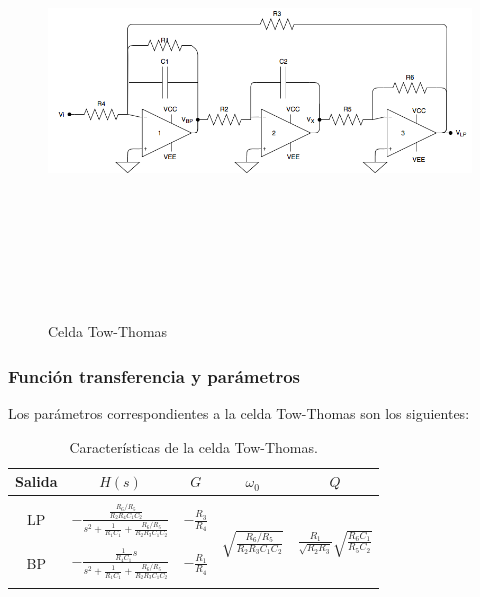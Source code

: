\begin{figure}[H] %
	\centering
	\includegraphics[width=12cm,height=12cm,keepaspectratio]{../EJ4/imagenes/TOW-THOMAS.png}
	\caption{Celda Tow-Thomas}
	\label{tow_thomas}
\end{figure}

\subsubsection{Funci\'on transferencia y par\'ametros}
Los par\'ametros correspondientes a la celda Tow-Thomas son los siguientes:

\begin{table}[H]
	\centering
	\begin{tabular}{c c c c c}
		Salida & $H(s)$ & $G$ & $\omega_0$ & $Q$\\
		\hline \\
		LP & $-\frac{\frac{R_6/R_5}{R_2R_4C_1C_2}}{s^2+\frac{1}{R_1C_1}+\frac{R_6/R_5}{R_2R_3C_1C_2}}$& $- \frac{R_3}{R_4}$& \multirow{4}{*}{$\sqrt{\frac{R_6/R_5}{R_2R_3C_1C_2}}$}&
		\multirow{4}{*}{$\frac{R_1}{\sqrt{R_2R_3}}\sqrt{\frac{R_6C_1}{R_5C_2}}$}\\ \\
		BP & $-\frac{\frac{1}{R_4 C_1}s}{s^2+\frac{1}{R_1C_1}+\frac{R_6/R_5}{R_2R_3C_1C_2}}$&$-\frac{R_1}{R_4}$& &\\ \\
		\hline
	\end{tabular}
	\caption{Caracter\'isticas de la celda Tow-Thomas.}
	\label{hg_tt}
\end{table}

